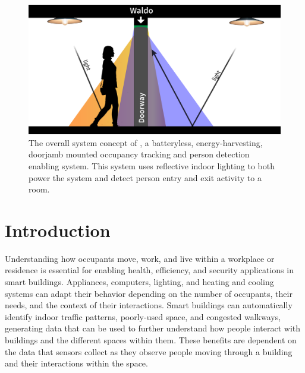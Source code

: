 \begin{figure}[t]
\centering
\includegraphics[width=\columnwidth]{figs/scenario.png}
\caption{ The overall system concept of \sysname, a batteryless, energy-harvesting, doorjamb mounted occupancy tracking and person detection enabling system.  This system uses reflective indoor lighting to both power the system and detect person entry and exit activity to a room.\label{fig:syspic}}
\end{figure}

\section{Introduction}
\label{sec:intro}

Understanding how occupants move, work, and live within a workplace or residence is essential for enabling health, efficiency, and security applications in smart buildings.
Appliances, computers, lighting, and heating and cooling systems can adapt their behavior depending on the number of occupants, their needs, and the context of their interactions.
Smart buildings can automatically identify indoor traffic patterns, poorly-used space, and congested walkways, generating data that can be used to further understand how people interact with buildings and the different spaces within them.
These benefits are dependent on the data that sensors collect as they observe people moving through a building and their interactions within the space.

